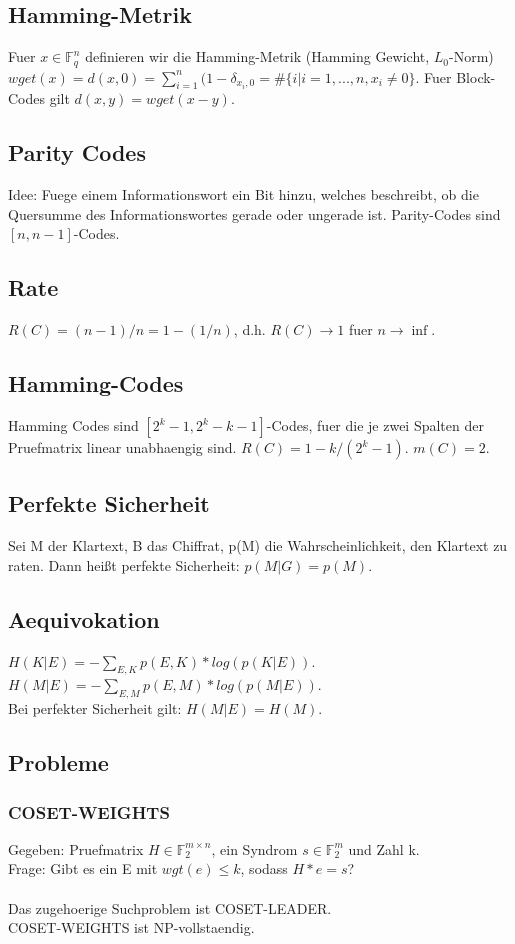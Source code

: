 \documentclass[a4paper]{scrreprt}
\begin{document}
\subsection{Hamming-Metrik}
Fuer $x \in \mathbb{F}_q^n$ definieren wir die Hamming-Metrik (Hamming Gewicht, $L_0$-Norm) $wget(x) = d(x,0) = \sum_{i=1}^n(1-\delta_{x_i,0} = \#\{i|i=1,...,n,x_i \neq 0\}$.
Fuer Block-Codes gilt $d(x,y) = wget(x-y)$.

\subsection{Parity Codes}
Idee: Fuege einem Informationswort ein Bit hinzu, welches beschreibt, ob die Quersumme des Informationswortes gerade oder ungerade ist. Parity-Codes sind $[n, n-1]$-Codes.

\subsection{Rate}
$R(C) = (n-1)/n = 1-(1/n)$, d.h. $R(C) \rightarrow 1$ fuer $n \rightarrow \inf$.

\subsection{Hamming-Codes}
Hamming Codes sind $[2^k - 1, 2^k - k - 1]$-Codes, fuer die je zwei Spalten der Pruefmatrix linear unabhaengig sind.
$R(C) = 1-k/(2^k-1)$.
$m(C) = 2$.

\subsection{Perfekte Sicherheit}
Sei M der Klartext, B das Chiffrat, p(M) die Wahrscheinlichkeit, den Klartext zu raten. Dann heißt perfekte Sicherheit: $p(M|G) = p(M)$.

\subsection{Aequivokation}
$H(K|E) = -\sum_{E,K} p(E,K) * log(p(K|E))$.\\
$H(M|E) = -\sum_{E,M} p(E,M) * log(p(M|E))$.\\
Bei perfekter Sicherheit gilt: $H(M|E) = H(M)$.



\subsection{Probleme}
\subsubsection{COSET-WEIGHTS}
Gegeben: Pruefmatrix $H \in \mathbb{F}_2^{m \times n}$, ein Syndrom $s \in \mathbb{F}_2^m$ und Zahl k.\\
Frage: Gibt es ein E mit $wgt(e) \le k$, sodass $H*e = s$?\\\\
Das zugehoerige Suchproblem ist COSET-LEADER.\\
COSET-WEIGHTS ist NP-vollstaendig.
\end{document}
